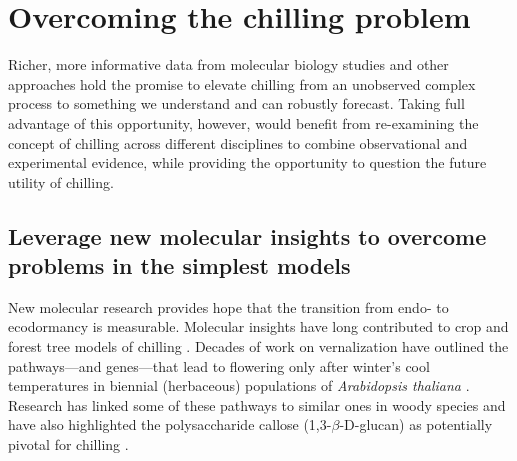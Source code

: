 \documentclass[11pt]{article}
\begin{document}
\section*{Overcoming the chilling problem}
Richer, more informative data from molecular biology studies and other approaches \citep{fouche2023transport,walde2024stable} hold the promise to elevate chilling from an unobserved complex process to something we understand and can robustly forecast. Taking full advantage of this opportunity, however, would benefit from re-examining the concept of chilling across different disciplines to combine observational and experimental evidence, while providing the opportunity to question the future utility of chilling.


\subsection*{Leverage new molecular insights to overcome problems in the simplest models}

New molecular research provides hope that the transition from endo- to ecodormancy is measurable. Molecular insights have long contributed to crop and forest tree models of chilling \citep{chuinearees}. Decades of work on vernalization have outlined the pathways---and genes---that lead to flowering only after winter's cool temperatures in biennial (herbaceous) populations of \emph{Arabidopsis thaliana} \citep[Figure \ref{fig:modelsketch},][]{Wilczek:2009oa,kim2009vernalization}. Research has linked some of these pathways to similar ones in woody species and have also highlighted the polysaccharide callose (1,3-$\beta$-{\sc D}-glucan) as potentially pivotal for chilling \citep{vanderschoot2014,pan2021aba}. 
\end{document}
